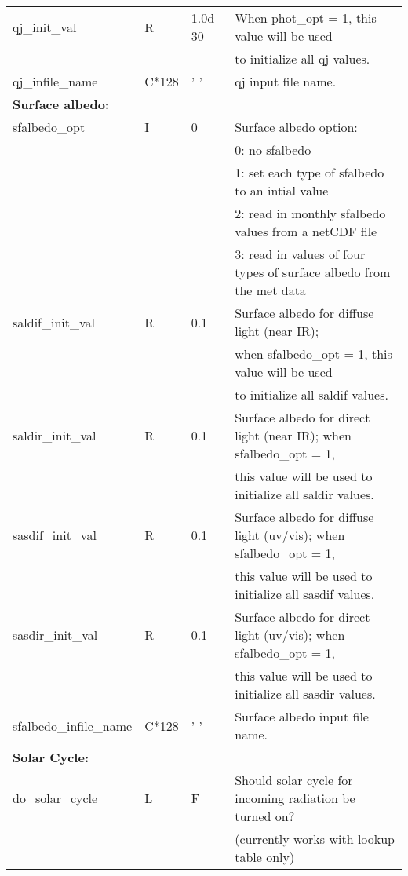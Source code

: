 {\begin{landscape}
\begin{center}
\begin{longtable}{|l|l|l|l|}
qj\_init\_val          & R &  1.0d-30  & When phot\_opt = 1, this value will be used  \\
                 &   &   &   to initialize all qj values.  \\ \hline
qj\_infile\_name       & C*128 & ' '       & qj input file name.  \\ \hline
\multicolumn{4}{|l|}{\bf Surface albedo:} \\ \hline
sfalbedo\_opt    & I & 0 & Surface albedo option:  \\
                 &   &   & 0:  no sfalbedo  \\
                 &   &   & 1:  set each type of sfalbedo to an intial value  \\
                 &   &   & 2:  read in monthly sfalbedo values from a  netCDF file \\
                 &   &   & 3:  read in values of four types of surface albedo from the met data \\ \hline 
saldif\_init\_val      & R & 0.1 & Surface albedo for diffuse light (near IR);  \\
                 &   &   & when sfalbedo\_opt = 1, this value will be used  \\
                 &   &   & to initialize all saldif values.  \\ \hline
saldir\_init\_val      & R & 0.1 & Surface albedo for direct light (near IR);  when sfalbedo\_opt = 1, \\
                       &   &   & this value will be used to initialize all saldir values.  \\ \hline
sasdif\_init\_val      & R & 0.1 & Surface albedo for diffuse light (uv/vis); when sfalbedo\_opt = 1,  \\
                 &   &   & this value will be used to initialize all sasdif values.  \\ \hline
sasdir\_init\_val      & R & 0.1 & Surface albedo for direct  light (uv/vis);  when sfalbedo\_opt = 1,  \\
                 &   &   & this value will be used to initialize all sasdir values.  \\ \hline
sfalbedo\_infile\_name & C*128 & ' ' & Surface albedo input file name.  \\ \hline
\multicolumn{4}{|l|}{\bf Solar Cycle:} \\ \hline
do\_solar\_cycle & L & F & Should solar cycle for incoming radiation be turned on?  \\
                 &   &   & (currently works with lookup table only)  \\ \hline

\end{longtable}
\end{center}
\end{landscape}}
